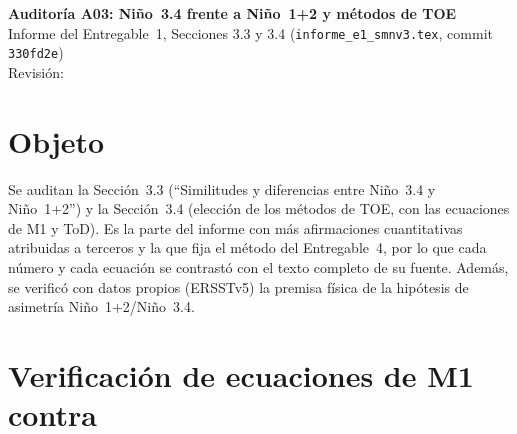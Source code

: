 \newcommand{\auditoriaid}{A03 -- Niño 3.4 frente a Niño 1+2 y métodos TOE}



\begin{center}
{\Large\bfseries Auditoría A03: Niño~3.4 frente a Niño~1+2 y métodos de TOE}\\[0.4em]
{\normalsize Informe del Entregable~1, Secciones 3.3 y 3.4 (\texttt{informe\_e1\_smnv3.tex}, commit \texttt{330fd2e})}\\[0.2em]
{\small Revisión: \fechaentrega}
\end{center}

\section{Objeto}

Se auditan la Sección~3.3 (``Similitudes y diferencias entre Niño~3.4 y Niño~1+2'') y la Sección~3.4 (elección de los métodos de TOE, con las ecuaciones de M1 y ToD). Es la parte del informe con más afirmaciones cuantitativas atribuidas a terceros y la que fija el método del Entregable~4, por lo que cada número y cada ecuación se contrastó con el texto completo de su fuente. Además, se verificó con datos propios (ERSSTv5) la premisa física de la hipótesis de asimetría Niño~1+2/Niño~3.4.

\section{Verificación de ecuaciones de M1 contra \citet{szabo2016}}

